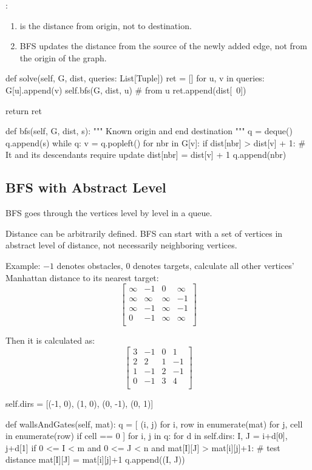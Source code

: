:
\begin{enumerate}
\item {} is the distance from origin, not to destination.
\item BFS updates the distance from the source of the newly added edge, not from the origin of the graph.
\end{enumerate}
\begin{python}
def solve(self, G, dist, queries: List[Tuple])
    ret = []
    for u, v in queries:
        G[u].append(v)
        self.bfs(G, dist, u)  # from u
        ret.append(dist[~0])
    
    return ret
    
def bfs(self, G, dist, s):
    """
    Known origin and end destination
    """
    q = deque()
    q.append(s)
    while q:
        v = q.popleft()
        for nbr in G[v]:
            if dist[nbr] > dist[v] + 1:
                # It and its descendants require update
                dist[nbr] = dist[v] + 1
                q.append(nbr)
\end{python}
\subsection{BFS with Abstract Level}
BFS goes through the vertices level by level in a queue. 

Distance can be arbitrarily defined. BFS can start with a set of vertices in abstract level of distance, not necessarily neighboring vertices.

Example: $-1$ denotes obstacles, $0$ denotes targets, calculate all other vertices' Manhattan distance to its nearest target:
$$
\begin{bmatrix}
\infty & -1 & 0 & \infty \\
\infty & \infty & \infty & -1 \\
\infty & -1 & \infty & -1 \\
0 & -1 & \infty & \infty \\
\end{bmatrix}
$$

Then it is calculated as:
$$
\begin{bmatrix}
3 & -1 & 0 & 1 \\
2 & 2 & 1 & -1 \\
1 & -1 & 2 & -1 \\
0 & -1 & 3 & 4 \\
\end{bmatrix}
$$

\begin{python}
self.dirs = [(-1, 0), (1, 0), (0, -1), (0, 1)]

def wallsAndGates(self, mat):
  q = [
    (i, j) 
    for i, row in enumerate(mat)
    for j, cell in enumerate(row) 
    if cell == 0
  ]
  for i, j in q:
    for d in self.dirs:
      I, J = i+d[0], j+d[1]
      if 0 <= I < m and 0 <= J < n 
        and mat[I][J] > mat[i][j]+1:  # test distance
        mat[I][J] = mat[i][j]+1
        q.append((I, J))
\end{python}


